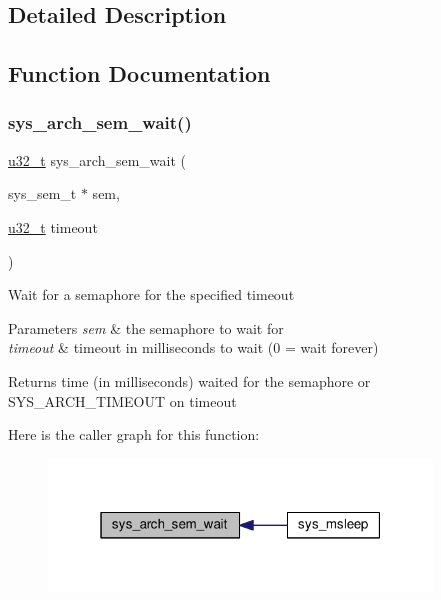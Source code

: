 \subsection{Detailed Description}


\subsection{Function Documentation}
\mbox{\label{group__sys__sem_ga8d364c5037778acb21c3df675db81b4f}} 
\subsubsection{\texorpdfstring{sys\+\_\+arch\+\_\+sem\+\_\+wait()}{sys\_arch\_sem\_wait()}}
{\footnotesize\ttfamily \hyperlink{group__compiler__abstraction_ga4c14294869aceba3ef9d4c0c302d0f33}{u32\+\_\+t} sys\+\_\+arch\+\_\+sem\+\_\+wait (\begin{DoxyParamCaption}\item[{sys\+\_\+sem\+\_\+t $\ast$}]{sem,  }\item[{\hyperlink{group__compiler__abstraction_ga4c14294869aceba3ef9d4c0c302d0f33}{u32\+\_\+t}}]{timeout }\end{DoxyParamCaption})}

Wait for a semaphore for the specified timeout 
\begin{DoxyParams}{Parameters}
{\em sem} & the semaphore to wait for \\
\hline
{\em timeout} & timeout in milliseconds to wait (0 = wait forever) \\
\hline
\end{DoxyParams}
\begin{DoxyReturn}{Returns}
time (in milliseconds) waited for the semaphore or S\+Y\+S\+\_\+\+A\+R\+C\+H\+\_\+\+T\+I\+M\+E\+O\+UT on timeout 
\end{DoxyReturn}
Here is the caller graph for this function\+:
\nopagebreak
\begin{figure}[H]
\begin{center}
\leavevmode
\includegraphics[width=289pt]{group__sys__sem_ga8d364c5037778acb21c3df675db81b4f_icgraph}
\end{center}
\end{figure}
\mbox{\label{group__sys__sem_ga83b781f96c30e915c752065a757da283}} 

